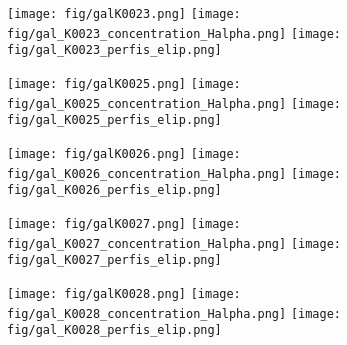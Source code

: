 \begin{figure}[!ht]
\begin{center}
\setcaptionmargin{1cm}
\texttt{[image: fig/galK0023.png]}
\texttt{[image: fig/gal\_K0023\_concentration\_Halpha.png]}
\texttt{[image: fig/gal\_K0023\_perfis\_elip.png]}
\end{center}
\end{figure}


\begin{figure}[!ht]
\begin{center}
\setcaptionmargin{1cm}
\texttt{[image: fig/galK0025.png]}
\texttt{[image: fig/gal\_K0025\_concentration\_Halpha.png]}
\texttt{[image: fig/gal\_K0025\_perfis\_elip.png]}
\end{center}
\end{figure}


\begin{figure}[!ht]
\begin{center}
\setcaptionmargin{1cm}
\texttt{[image: fig/galK0026.png]}
\texttt{[image: fig/gal\_K0026\_concentration\_Halpha.png]}
\texttt{[image: fig/gal\_K0026\_perfis\_elip.png]}
\end{center}
\end{figure}


\begin{figure}[!ht]
\begin{center}
\setcaptionmargin{1cm}
\texttt{[image: fig/galK0027.png]}
\texttt{[image: fig/gal\_K0027\_concentration\_Halpha.png]}
\texttt{[image: fig/gal\_K0027\_perfis\_elip.png]}
\end{center}
\end{figure}



\begin{figure}[!ht]
\begin{center}
\setcaptionmargin{1cm}
\texttt{[image: fig/galK0028.png]}
\texttt{[image: fig/gal\_K0028\_concentration\_Halpha.png]}
\texttt{[image: fig/gal\_K0028\_perfis\_elip.png]}
\end{center}
\end{figure}


